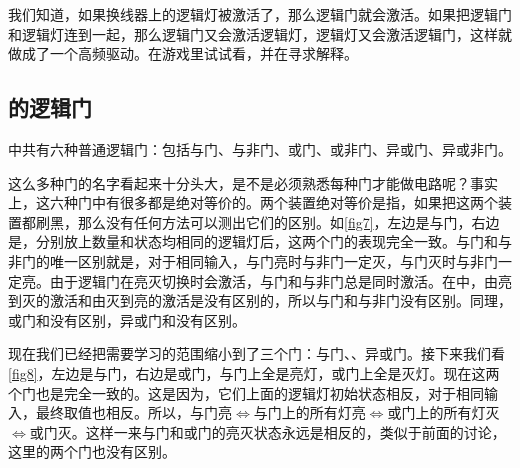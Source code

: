 \begin{example}{}{}

  我们知道，如果换线器上的逻辑灯被激活了，那么逻辑门就会激活。如果把逻辑门和逻辑灯连到一起，那么逻辑门又会激活逻辑灯，逻辑灯又会激活逻辑门，这样就做成了一个高频驱动。在游戏里试试看，并在寻求解释。
\end{example}

\subsection{的逻辑门}
\termTR 中共有六种普通逻辑门：包括与门、与非门、或门、或非门、异或门、异或非门。

\begin{figure}[!ht]
  \centering
  \caption{}
\end{figure}

这么多种门的名字看起来十分头大，是不是必须熟悉每种门才能做电路呢？事实上，这六种门中有很多都是绝对等价的。两个装置绝对等价是指，如果把这两个装置都刷黑，那么没有任何方法可以测出它们的区别。如\autoref{fig7}，左边是与门，右边是，分别放上数量和状态均相同的逻辑灯后，这两个门的表现完全一致。与门和与非门的唯一区别就是，对于相同输入，与门亮时与非门一定灭，与门灭时与非门一定亮。由于逻辑门在亮灭切换时会激活，与门和与非门总是同时激活。在\termTR 中，由亮到灭的激活和由灭到亮的激活是没有区别的，所以与门和与非门没有区别。同理，或门和没有区别，异或门和没有区别。

现在我们已经把需要学习的范围缩小到了三个门：与门、、异或门。接下来我们看\autoref{fig8}，左边是与门，右边是或门，与门上全是亮灯，或门上全是灭灯。现在这两个门也是完全一致的。这是因为，它们上面的逻辑灯初始状态相反，对于相同输入，最终取值也相反。所以，与门亮$\Longleftrightarrow$与门上的所有灯亮$\Longleftrightarrow$或门上的所有灯灭$\Longleftrightarrow$或门灭。这样一来与门和或门的亮灭状态永远是相反的，类似于前面的讨论，这里的两个门也没有区别。

